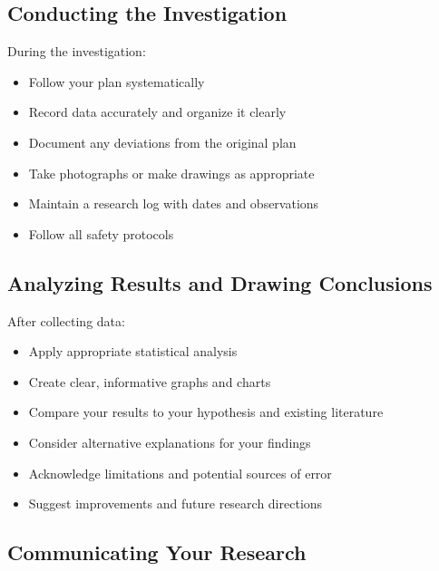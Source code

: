 \documentclass[justified,notoc]{tufte-book}
\begin{document}
\subsection{Conducting the Investigation}

During the investigation:
\begin{itemize}
    \item Follow your plan systematically
    \item Record data accurately and organize it clearly
    \item Document any deviations from the original plan
    \item Take photographs or make drawings as appropriate
    \item Maintain a research log with dates and observations
    \item Follow all safety protocols
\end{itemize}

\subsection{Analyzing Results and Drawing Conclusions}

After collecting data:
\begin{itemize}
    \item Apply appropriate statistical analysis
    \item Create clear, informative graphs and charts
    \item Compare your results to your hypothesis and existing literature
    \item Consider alternative explanations for your findings
    \item Acknowledge limitations and potential sources of error
    \item Suggest improvements and future research directions
\end{itemize}

\subsection{Communicating Your Research}
\end{document}
